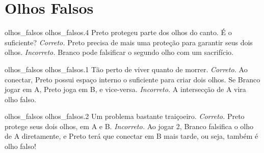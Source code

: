 \chapter{Olhos Falsos}

\emptypage

\problemAnswerDiagram
  {olhos_falsos}
  {olhos_falsos.4}
  {Preto protegeu parte dos olhos do canto. É o suficiente?}
  {\emph{Correto.} Preto precisa de mais uma proteção para garantir seus dois olhos.}
  {\emph{Incorreto.} Branco pode falsificar o segundo olho com um sacrifício.}

\problemAnswerDiagram
  {olhos_falsos}
  {olhos_falsos.1}
  {Tão perto de viver quanto de morrer.}
  {\emph{Correto.} Ao conectar, Preto possui espaço interno o suficiente para criar dois olhos. Se Branco jogar em A, Preto joga em B, e vice-versa.}
  {\emph{Incorreto.} A intersecção de A vira olho falso.}

\problemAnswerDiagram
  {olhos_falsos}
  {olhos_falsos.2}
  {Um problema bastante traiçoeiro.}
  {\emph{Correto.} Preto protege seus dois olhos, em A e B.}
  {\emph{Incorreto.} Ao jogar 2, Branco falsifica o olho de A diretamente, e Preto terá que conectar em B mais tarde, ou seja, também é olho falso!}